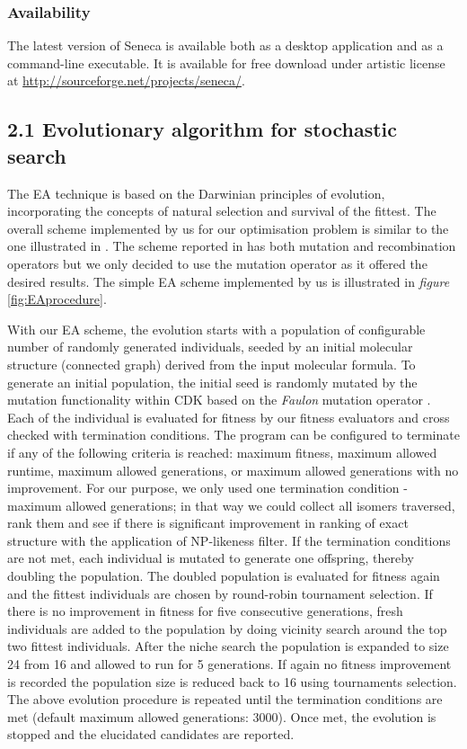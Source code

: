 \documentclass[10pt]{bmc_article}
\newenvironment{bmcformat}{\begin{raggedright}\baselineskip20pt\sloppy\setboolean{publ}{false}}{\end{raggedright}\baselineskip20pt\sloppy}
\begin{document}
\begin{bmcformat}
      
            \subsubsection*{Availability}
     The latest version of Seneca is available both as a desktop application and as a command-line executable. It is available for free download under artistic license at \url{http://sourceforge.net/projects/seneca/}.
   
	
\subsection*{2.1 Evolutionary algorithm for stochastic search}


 
 The EA technique is based on the Darwinian principles of evolution, incorporating the concepts of natural selection and survival of the fittest. The overall scheme implemented by us for our optimisation problem is similar to the one illustrated in \cite{Han}. The scheme reported in \cite{Han} has both mutation and recombination operators but we only decided to use the mutation operator as it offered the desired results. The simple EA scheme implemented by us is illustrated in \emph{figure} \ref{fig:EAprocedure}.
 
With our EA scheme, the evolution starts with a population of configurable number of randomly generated individuals, seeded by an initial molecular structure (connected graph) derived from the input molecular formula.  
To generate an initial population, the initial seed is randomly mutated by the mutation functionality within CDK based on the \emph{Faulon} mutation operator \cite{Faulon} . Each of the individual is evaluated for fitness by our fitness evaluators and cross checked with termination conditions. The program can be configured to terminate if any of the following criteria is reached: maximum fitness, maximum allowed runtime, maximum allowed generations, or maximum allowed generations with no improvement. For our purpose, we only used one termination condition - maximum allowed generations; in that way we could collect all isomers traversed, rank them and see if there is significant improvement in ranking of exact structure with the application  of NP-likeness filter. If the termination conditions are not met, each individual is mutated to generate one offspring, thereby doubling the population. The doubled population is evaluated for fitness again and the fittest individuals are chosen by round-robin tournament selection. If there is no improvement in fitness for five consecutive generations, fresh individuals are added to the population by doing vicinity search around the top two fittest individuals. After the niche search the population is expanded to size 24 from 16 and allowed to run for 5 generations. If again no fitness improvement is recorded the population size is reduced back to 16 using tournaments selection. The above evolution procedure is repeated until the termination conditions are met (default maximum allowed generations: 3000). Once met, the evolution is stopped and the elucidated candidates are reported. 


\end{bmcformat}
\end{document}
